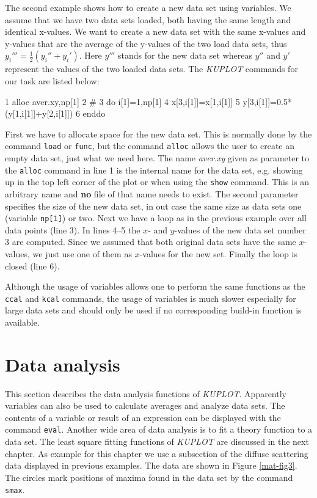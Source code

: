 The second example shows how to create a new data set using variables.
We assume that we have two data sets loaded, both having the same length
and identical x-values. We want to create a new data set with
the same x-values and y-values that are the average of the y-values of
the two load data sets, thus $y_{i}'''=\frac{1}{2}(y_{i}''+y_{i}')$.
Here $y'''$ stands for the new data set whereas $y''$ and $y'$
represent the values of the two loaded data sets. The {\it KUPLOT}
commands for our task are listed below:

\footnotesize
\begin{MacVerbatim}
     1  alloc aver.xy,np[1]
     2  #
     3  do i[1]=1,np[1]
     4    x[3,i[1]]=x[1,i[1]]
     5    y[3,i[1]]=0.5*(y[1,i[1]]+y[2,i[1]])
     6  enddo
\end{MacVerbatim}
\normalsize

First we have to allocate space for the new data set. This is
normally done by the command {\tt load} or {\tt func}, but the
command {\tt alloc} allows the user to create an empty data set,
just what we need here. The name {\it aver.xy} given as parameter to
the {\tt alloc} command in line 1 is the internal name for the data
set, e.g. showing up in the top left corner of the plot or when
using the {\tt show} command. This is an arbitrary name and {\bf no}
file of that name needs to exist. The second parameter specifies the
size of the new data set, in out case the same size as data sets one
(variable {\tt np[1]}) or two. Next we have a loop as in the
previous example over all data points (line 3). In lines 4--5 the
$x$- and $y$-values of the new data set number 3 are computed. Since
we assumed that both original data sets have the same $x$-values, we
just use one of them as $x$-values for the new set. Finally the loop
is closed (line 6).
\par

Although the usage of variables allows one to perform the same
functions as the {\tt ccal} and {\tt kcal} commands, the usage of
variables is much slower especially for large data sets and should
only be used if no corresponding build-in function is available.


\section{Data analysis \label{mat-anal}}

This section describes the data analysis functions of {\it KUPLOT}.
Apparently variables can also be used to calculate averages and
analyze data sets. The contents of a variable or result of an
expression can be displayed with the command {\tt eval}. Another
wide area of data analysis is to fit a theory function to a data
set. The least square fitting functions of {\it KUPLOT} are
discussed in the next chapter. As example for this chapter we use a
subsection of the diffuse scattering data displayed in previous
examples. The data are shown in Figure \ref{mat-fig3}. The circles
mark positions of maxima found in the data set by the command {\tt
smax}.

